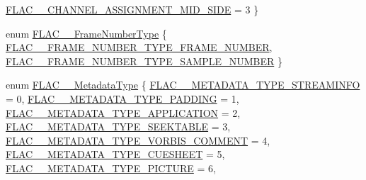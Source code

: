 \begin{DoxyCompactItemize}
\mbox{\hyperlink{group__flac__format_gga79855f8525672e37f299bbe02952ef9ca85c1512c0473b5ede364a9943759a80c}{F\+L\+A\+C\+\_\+\+\_\+\+C\+H\+A\+N\+N\+E\+L\+\_\+\+A\+S\+S\+I\+G\+N\+M\+E\+N\+T\+\_\+\+M\+I\+D\+\_\+\+S\+I\+DE}} = 3
 \}
\item 
enum \mbox{\hyperlink{group__flac__format_ga8fe9ebc78386cd2a3d23b7b8e3818e1c}{F\+L\+A\+C\+\_\+\+\_\+\+Frame\+Number\+Type}} \{ \mbox{\hyperlink{group__flac__format_gga8fe9ebc78386cd2a3d23b7b8e3818e1ca0b9cbf3853f0ae105cf9b5360164f794}{F\+L\+A\+C\+\_\+\+\_\+\+F\+R\+A\+M\+E\+\_\+\+N\+U\+M\+B\+E\+R\+\_\+\+T\+Y\+P\+E\+\_\+\+F\+R\+A\+M\+E\+\_\+\+N\+U\+M\+B\+ER}}, 
\mbox{\hyperlink{group__flac__format_gga8fe9ebc78386cd2a3d23b7b8e3818e1ca9220ce93dcc151e5edd5db7e7155b35a}{F\+L\+A\+C\+\_\+\+\_\+\+F\+R\+A\+M\+E\+\_\+\+N\+U\+M\+B\+E\+R\+\_\+\+T\+Y\+P\+E\+\_\+\+S\+A\+M\+P\+L\+E\+\_\+\+N\+U\+M\+B\+ER}}
 \}
\item 
enum \mbox{\hyperlink{group__flac__format_gac71714ba8ddbbd66d26bb78a427fac01}{F\+L\+A\+C\+\_\+\+\_\+\+Metadata\+Type}} \{ \newline
\mbox{\hyperlink{group__flac__format_ggac71714ba8ddbbd66d26bb78a427fac01acffa517e969ba6a868dcf10e5da75c28}{F\+L\+A\+C\+\_\+\+\_\+\+M\+E\+T\+A\+D\+A\+T\+A\+\_\+\+T\+Y\+P\+E\+\_\+\+S\+T\+R\+E\+A\+M\+I\+N\+FO}} = 0, 
\mbox{\hyperlink{group__flac__format_ggac71714ba8ddbbd66d26bb78a427fac01a6dcb741fc0aef389580f110e88beb896}{F\+L\+A\+C\+\_\+\+\_\+\+M\+E\+T\+A\+D\+A\+T\+A\+\_\+\+T\+Y\+P\+E\+\_\+\+P\+A\+D\+D\+I\+NG}} = 1, 
\mbox{\hyperlink{group__flac__format_ggac71714ba8ddbbd66d26bb78a427fac01a2b287a22a1ac9440b309127884c8d41b}{F\+L\+A\+C\+\_\+\+\_\+\+M\+E\+T\+A\+D\+A\+T\+A\+\_\+\+T\+Y\+P\+E\+\_\+\+A\+P\+P\+L\+I\+C\+A\+T\+I\+ON}} = 2, 
\mbox{\hyperlink{group__flac__format_ggac71714ba8ddbbd66d26bb78a427fac01a5f6323e489be1318f0e3747960ebdd91}{F\+L\+A\+C\+\_\+\+\_\+\+M\+E\+T\+A\+D\+A\+T\+A\+\_\+\+T\+Y\+P\+E\+\_\+\+S\+E\+E\+K\+T\+A\+B\+LE}} = 3, 
\newline
\mbox{\hyperlink{group__flac__format_ggac71714ba8ddbbd66d26bb78a427fac01ad013576bc5196b907547739518605520}{F\+L\+A\+C\+\_\+\+\_\+\+M\+E\+T\+A\+D\+A\+T\+A\+\_\+\+T\+Y\+P\+E\+\_\+\+V\+O\+R\+B\+I\+S\+\_\+\+C\+O\+M\+M\+E\+NT}} = 4, 
\mbox{\hyperlink{group__flac__format_ggac71714ba8ddbbd66d26bb78a427fac01a0b3f07ae60609126562cd0233ce00a65}{F\+L\+A\+C\+\_\+\+\_\+\+M\+E\+T\+A\+D\+A\+T\+A\+\_\+\+T\+Y\+P\+E\+\_\+\+C\+U\+E\+S\+H\+E\+ET}} = 5, 
\mbox{\hyperlink{group__flac__format_ggac71714ba8ddbbd66d26bb78a427fac01acf28ae2788366617c1aeab81d5961c6e}{F\+L\+A\+C\+\_\+\+\_\+\+M\+E\+T\+A\+D\+A\+T\+A\+\_\+\+T\+Y\+P\+E\+\_\+\+P\+I\+C\+T\+U\+RE}} = 6, 

\end{DoxyCompactItemize}
